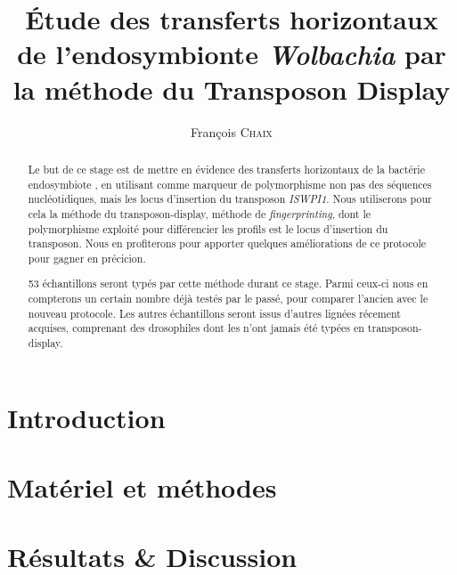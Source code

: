 \documentclass[a4paper, 12pt, linktocpage=true, twoside]{memoir}
\title{Étude des transferts horizontaux de l’endosymbionte \textit{Wolbachia} par la méthode du Transposon Display}
\author{François \textsc{Chaix}}
\renewcommand{\baselinestretch}{1.5}
\begin{document}
\maketitle
\tableofcontents

\chapter{Introduction}


\chapter{Matériel et méthodes}


\chapter{Résultats \& Discussion}


\printbibliography
\listoffigures

\newpage
\pagestyle{empty}
\renewcommand{\baselinestretch}{1} %
\begin{abstract}
Le but de ce stage est de mettre en évidence des transferts horizontaux de la bactérie endosymbiote ,
en utilisant comme marqueur de polymorphisme non pas des séquences nucléotidiques, mais les locus d'insertion du transposon \textit{ISWPI1}.
Nous utiliserons pour cela la méthode du transposon-display, méthode de \textit{fingerprinting}, dont le polymorphisme exploité pour différencier les profils est le locus d'insertion du transposon.
Nous en profiterons pour apporter quelques améliorations de ce protocole pour gagner en précicion.

53 échantillons seront typés par cette méthode durant ce stage. Parmi ceux-ci nous en compterons un certain nombre déjà testés par le passé, pour comparer l'ancien avec le nouveau protocole.
Les autres échantillons seront issus d'autres lignées récement acquises, comprenant des drosophiles dont les  n'ont jamais été typées en transposon-display.
\end{abstract}
\end{document}
